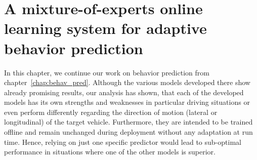 \chapter{A mixture-of-experts online learning system for adaptive behavior prediction}
\label{chap:mix_online_learning}
In this chapter, we continue our work on behavior prediction from chapter~\ref{chap:behav_pred}.
Although the various models developed there show already promising results, our analysis has shown, that each of the developed models has its own strengths and weaknesses in particular driving situations or even perform differently regarding the direction of motion (lateral or longitudinal) of the target vehicle.
Furthermore, they are intended to be trained offline and remain unchanged during deployment without any adaptation at run time.
Hence, relying on just one specific predictor would lead to sub-optimal performance in situations where one of the other models is superior.

